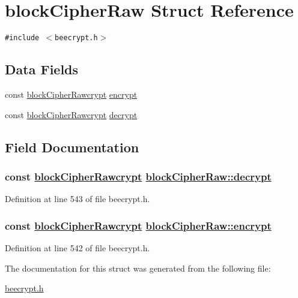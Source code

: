 \hypertarget{structblockCipherRaw}{
\section{block\-Cipher\-Raw Struct Reference}
\label{structblockCipherRaw}
}
{\tt \#include $<$beecrypt.h$>$}

\subsection*{Data Fields}
\begin{CompactItemize}
\item 
const \hyperlink{group__BC__m_ga3}{block\-Cipher\-Rawcrypt} \hyperlink{structblockCipherRaw_o0}{encrypt}
\item 
const \hyperlink{group__BC__m_ga3}{block\-Cipher\-Rawcrypt} \hyperlink{structblockCipherRaw_o1}{decrypt}
\end{CompactItemize}


\subsection{Field Documentation}
\hypertarget{structblockCipherRaw_o1}{
\subsubsection[decrypt]{\setlength{\rightskip}{0pt plus 5cm}const \hyperlink{group__BC__m_ga3}{block\-Cipher\-Rawcrypt} \hyperlink{structblockCipherRaw_o1}{block\-Cipher\-Raw::decrypt}}}
\label{structblockCipherRaw_o1}


Definition at line 543 of file beecrypt.h.\hypertarget{structblockCipherRaw_o0}{
\subsubsection[encrypt]{\setlength{\rightskip}{0pt plus 5cm}const \hyperlink{group__BC__m_ga3}{block\-Cipher\-Rawcrypt} \hyperlink{structblockCipherRaw_o0}{block\-Cipher\-Raw::encrypt}}}
\label{structblockCipherRaw_o0}


Definition at line 542 of file beecrypt.h.

The documentation for this struct was generated from the following file:\begin{CompactItemize}
\item 
\hyperlink{beecrypt_8h}{beecrypt.h}\end{CompactItemize}
